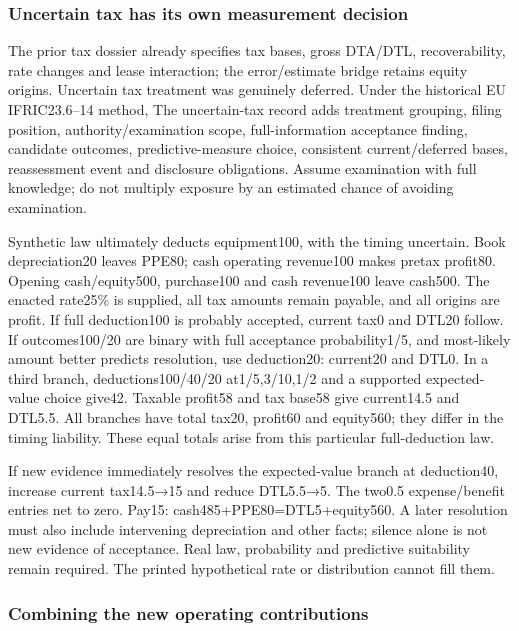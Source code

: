 \hypertarget{uncertain-tax-has-its-own-measurement-decision}{%
\subsubsection{Uncertain tax has its own measurement decision}\label{uncertain-tax-has-its-own-measurement-decision}}

The prior tax dossier already specifies tax bases, gross DTA/DTL, recoverability, rate changes and lease interaction; the error/estimate bridge retains equity origins. Uncertain tax treatment was genuinely deferred. Under the historical EU IFRIC23.6--14 method, The uncertain-tax record adds treatment grouping, filing position, authority/examination scope, full-information acceptance finding, candidate outcomes, predictive-measure choice, consistent current/deferred bases, reassessment event and disclosure obligations. Assume examination with full knowledge; do not multiply exposure by an estimated chance of avoiding examination.

Synthetic law ultimately deducts equipment100, with the timing uncertain. Book depreciation20 leaves PPE80; cash operating revenue100 makes pretax profit80. Opening cash/equity500, purchase100 and cash revenue100 leave cash500. The enacted rate25\% is supplied, all tax amounts remain payable, and all origins are profit. If full deduction100 is probably accepted, current tax0 and DTL20 follow. If outcomes100/20 are binary with full acceptance probability1/5, and most-likely amount better predicts resolution, use deduction20: current20 and DTL0. In a third branch, deductions100/40/20 at1/5,3/10,1/2 and a supported expected-value choice give42. Taxable profit58 and tax base58 give current14.5 and DTL5.5. All branches have total tax20, profit60 and equity560; they differ in the timing liability. These equal totals arise from this particular full-deduction law.

If new evidence immediately resolves the expected-value branch at deduction40, increase current tax14.5→15 and reduce DTL5.5→5. The two0.5 expense/benefit entries net to zero. Pay15: cash485+PPE80=DTL5+equity560. A later resolution must also include intervening depreciation and other facts; silence alone is not new evidence of acceptance. Real law, probability and predictive suitability remain required. The printed hypothetical rate or distribution cannot fill them.

\hypertarget{combining-the-new-operating-contributions}{%
\subsubsection{Combining the new operating contributions}\label{combining-the-new-operating-contributions}}

